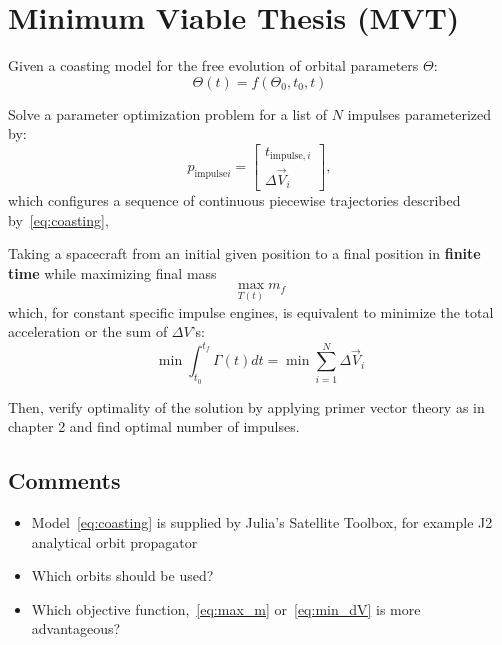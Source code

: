 \section{Minimum Viable Thesis (MVT)}

Given a coasting model for the free evolution of orbital parameters \(\Theta\):
\begin{equation} \label{eq:coasting}
    \Theta(t) = f(\Theta_0, t_0, t)
\end{equation}

Solve a parameter optimization problem for a list of \(N\) impulses parameterized by:
\begin{equation} 
    p_{\text{impulse}i} = \begin{bmatrix}
        t_{\text{impulse},i} \\
        \Delta \vec{V}_i
    \end{bmatrix},
\end{equation}
which configures a sequence of continuous piecewise trajectories described by~\eqref{eq:coasting},

Taking a spacecraft from an initial given position to a final position in \textbf{finite time} while maximizing final mass
\begin{equation} \label{eq:max_m}
    \max_{T(t)} m_f 
\end{equation}
which, for constant specific impulse engines, is equivalent to minimize the total acceleration or the sum of \(\Delta V\)'s:
\begin{equation} \label{eq:min_dV}
    \min \int_{t_0}^{t_f} \Gamma(t) dt = \min \sum_{i=1}^N \Delta \vec{V}_i
\end{equation}

Then, verify optimality of the solution by applying primer vector theory as in \cite{Conway_2010} chapter 2 and find optimal number of impulses.

\subsection{Comments}

\begin{itemize}
    \item Model~\eqref{eq:coasting} is supplied by Julia's Satellite Toolbox, for example J2 analytical orbit propagator
    \item Which orbits should be used?
    \item Which objective function,~\eqref{eq:max_m} or~\eqref{eq:min_dV} is more advantageous?
\end{itemize}

